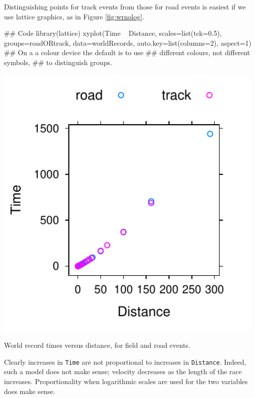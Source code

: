 \documentclass{tufte-book}\usepackage[]{graphicx}\usepackage[]{color}
\newcommand{\txtt}[1]{\texttt{#1}}
\begin{document}
Distinguishing points for track events from those for road events is
easiest if we use lattice graphics, as in Figure \ref{fig:wrnolog}.

\begin{Schunk}
\begin{Sinput}
## Code
library(lattice)
xyplot(Time ~ Distance, scales=list(tck=0.5),
       groups=roadORtrack, data=worldRecords,
       auto.key=list(columns=2), aspect=1)
## On a a colour device the default is to use
## different colours, not different symbols,
## to distinguish groups.
\end{Sinput}
\end{Schunk}

\begin{marginfigure}
\begin{Schunk}


\centerline{\includegraphics[width=0.98\textwidth]{figs/03-trackVSroad-1} }

\end{Schunk}
\caption{World record times versus distance, for field and road
  events.\label{fig:wrnolog}}
\end{marginfigure}

Clearly increases in \txtt{Time} are not proportional to increases in
\txtt{Distance}.  Indeed, such a model does not make sense; velocity
decreases as the length of the race increases.  Proportionality when
logarithmic scales are used for the two variables does make sense.
\end{document}
